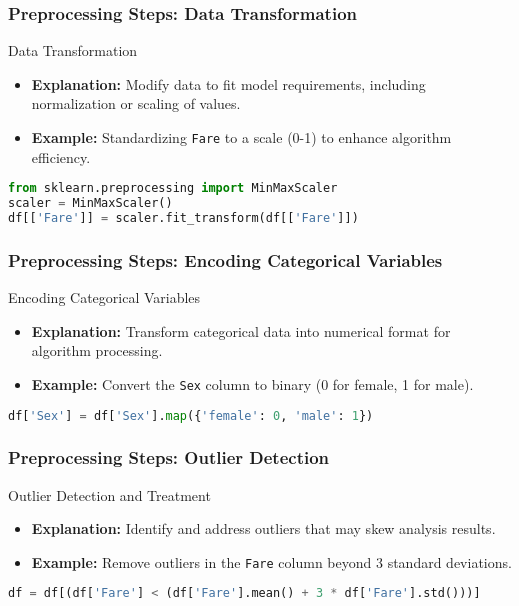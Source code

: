 \documentclass[aspectratio=169]{beamer}
\begin{document}
\begin{frame}[fragile]
    \frametitle{Preprocessing Steps: Data Transformation}
    \begin{block}{Data Transformation}
        \begin{itemize}
            \item \textbf{Explanation:} Modify data to fit model requirements, including normalization or scaling of values.
            \item \textbf{Example:} Standardizing \texttt{Fare} to a scale (0-1) to enhance algorithm efficiency.
        \end{itemize}
        \begin{lstlisting}[language=Python]
from sklearn.preprocessing import MinMaxScaler
scaler = MinMaxScaler()
df[['Fare']] = scaler.fit_transform(df[['Fare']])
        \end{lstlisting}
    \end{block}
\end{frame}

\begin{frame}[fragile]
    \frametitle{Preprocessing Steps: Encoding Categorical Variables}
    \begin{block}{Encoding Categorical Variables}
        \begin{itemize}
            \item \textbf{Explanation:} Transform categorical data into numerical format for algorithm processing.
            \item \textbf{Example:} Convert the \texttt{Sex} column to binary (0 for female, 1 for male).
        \end{itemize}
        \begin{lstlisting}[language=Python]
df['Sex'] = df['Sex'].map({'female': 0, 'male': 1})
        \end{lstlisting}
    \end{block}
\end{frame}

\begin{frame}[fragile]
    \frametitle{Preprocessing Steps: Outlier Detection}
    \begin{block}{Outlier Detection and Treatment}
        \begin{itemize}
            \item \textbf{Explanation:} Identify and address outliers that may skew analysis results.
            \item \textbf{Example:} Remove outliers in the \texttt{Fare} column beyond 3 standard deviations.
        \end{itemize}
        \begin{lstlisting}[language=Python]
df = df[(df['Fare'] < (df['Fare'].mean() + 3 * df['Fare'].std()))]
        \end{lstlisting}
    \end{block}
\end{frame}
\end{document}
